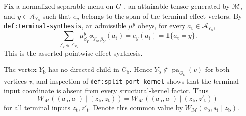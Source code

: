 Fix a normalized separable menu on \(G_{\mathrm b}\), an attainable tensor generated by \(\mathcal M\), and \(y\in\mathcal A_{Y_{\mathrm b}}\) such that \(e_y\) belongs to the span of the terminal effect vectors.  By \texttt{def:terminal-synthesis}, an admissible \(\mu^y\) obeys, for every \(a_{\mathrm t}\in\mathcal A_{Y_{\mathrm b}}\),
\[
 \sum_{\beta_Y\in\mathcal L_{Y_{\mathrm b}}}
 \mu^y_{\beta_Y}\phi_{Y_{\mathrm b},\beta_Y}(a_{\mathrm t})
 =e_y(a_{\mathrm t})
 =\mathbf 1\{a_{\mathrm t}=y\}.
\]
This is the asserted pointwise effect synthesis.

The vertex \(Y_{\mathrm b}\) has no directed child in \(G_{\mathrm b}\).  Hence \(Y_{\mathrm b}\notin\operatorname{pa}_{G_{\mathrm b}}(v)\) for both vertices \(v\), and inspection of \texttt{def:split-port-kernel} shows that the terminal input coordinate is absent from every structural-kernel factor.  Thus
\[
 W_{\mathcal M}((a_{\mathrm b},a_{\mathrm t})\mid
 (z_{\mathrm b},z_{\mathrm t}))
 =W_{\mathcal M}((a_{\mathrm b},a_{\mathrm t})\mid
 (z_{\mathrm b},z'_{\mathrm t}))
\]
for all terminal inputs \(z_{\mathrm t},z'_{\mathrm t}\).  Denote this common value by \(\overline W_{\mathcal M}(a_{\mathrm b},a_{\mathrm t}\mid z_{\mathrm b})\).

